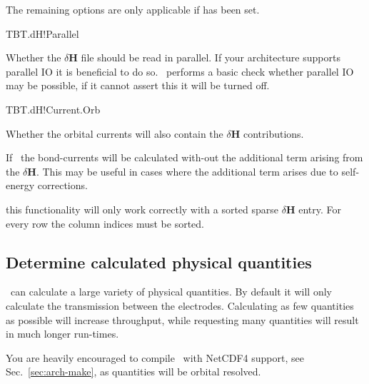 The remaining options are only applicable if  has been
set. 

\begin{fdflogicalT}{TBT.dH!Parallel}

  Whether the $\delta\mathbf H$ file should be read in parallel. If
  your architecture supports parallel IO it is beneficial to do so. 
  \tbtrans\ performs a basic check whether parallel IO may be
  possible, if it cannot assert this it will be turned off.
  
\end{fdflogicalT}

\begin{fdflogicalT}{TBT.dH!Current.Orb}

  Whether the orbital currents will also contain the $\delta \mathbf
  H$ contributions.

  If \fdffalse\ the bond-currents will be calculated with-out the
  additional term arising from the $\delta \mathbf H$. This may be
  useful in cases where the additional term arises due to self-energy
  corrections.

  \note this functionality will only work correctly with a sorted
  sparse $\delta \mathbf H$ entry. For every row the column indices
  must be sorted.

\end{fdflogicalT}


\subsection{Determine calculated physical quantities}
\label{sec:physical}

\tbtrans\ can calculate a large variety of physical
quantities. By default it will only calculate the transmission between
the electrodes. Calculating as few quantities as possible will
increase throughput, while requesting many quantities will result in
much longer run-times.

You are heavily encouraged to compile \tbtrans\ with NetCDF4 support,
see Sec.~\ref{sec:arch-make}, as quantities will be orbital resolved. 

